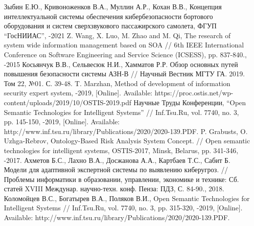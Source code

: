 \begin{thebibliography}{}
Зыбин Е.Ю., Кривоноженков В.А., Муллин А.Р., Кохан В.В., Концепция
интеллектуальной системы обеспечения кибербезопасности бортового оборудования
и систем сверхзвукового пассажирского самолета, ФГУП ``ГосНИИАС'', -2021
Z. Wang, X. Luo, M. Zhao and M. Qi,
The research of system wide information management based on SOA  // 6th
IEEE International Conference on Software Engineering and Service Science (ICSESS),
pp. 837-840., -2015
Косьянчук В.В., Сельвесюк Н.И., Хамматов Р.Р. Обзор основных путей повышения безопасности системы АЗН-В
// Научный Вестник МГТУ ГА. 2019. Том 22, №01. С. 39-48.
T. Marzhan, Method of development of information security expert system, -2019, [Online].
Available: https://proc.ostis.net/wp-content/uploads/2019/10/OSTIS-2019.pdf
Научные Труды Конференции, “Open Semantic Technologies for Intelligent Systems”
// Inf.Tsu.Ru, vol. 7740, no. 3, pp. 145-150, -2019,
[Online]. Available: http://www.inf.tsu.ru/library/Publications/2020/2020-139.PDF.
P. Grabusts, O. Uzhga-Rebrov, Ontology-Based Risk Analysis System Concept.
// Open semantic technologies for intelligent systems, OSTIS-2017, Minsk, Belarus, pp. 341-346, -2017.
Ахметов Б.С., Лахно В.А., Досжанова А.А., Картбаев Т.С., Сабит Б. Модели для
адаптивной экспертной системы по выявлению киберугроз. // Проблемы информатики в
образовании, управлении, экономике и технике: Сб. статей XVIII Междунар. научно-техн. конф. Пенза:
ПДЗ, С. 84-90., 2018.
Коломойцев В.С., Богатырев В.А., Поляков В.И., Open Semantic Technologies for Intelligent Systems
// Inf.Tsu.Ru, vol. 7740, no. 3, pp. 315-320, -2019,
[Online]. Available: http://www.inf.tsu.ru/library/Publications/2020/2020-139.PDF.
\end{thebibliography}


